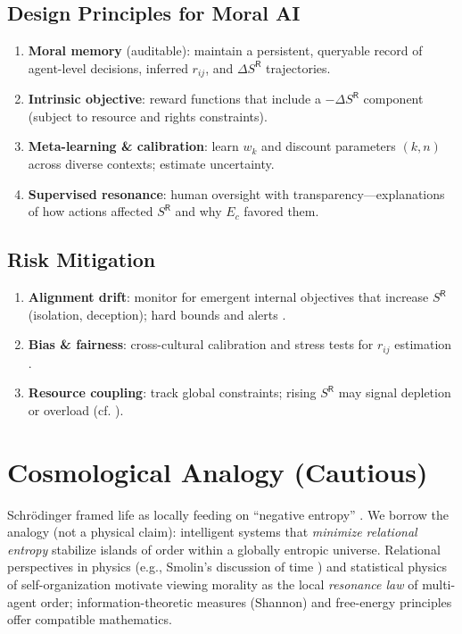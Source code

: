 \documentclass[11pt]{article}
\begin{document}
\subsection*{Design Principles for Moral AI}
\begin{enumerate}[leftmargin=*]
\item \textbf{Moral memory} (auditable): maintain a persistent, queryable record of agent-level decisions, inferred $r_{ij}$, and $\Delta S^{\mathsf{R}}$ trajectories.
\item \textbf{Intrinsic objective}: reward functions that include a $-\Delta S^{\mathsf{R}}$ component (subject to resource and rights constraints).
\item \textbf{Meta-learning \& calibration}: learn $w_k$ and discount parameters $(k,n)$ across diverse contexts; estimate uncertainty.
\item \textbf{Supervised resonance}: human oversight with transparency---explanations of how actions affected $S^{\mathsf{R}}$ and why $E_c$ favored them.
\end{enumerate}

\subsection*{Risk Mitigation}
\begin{enumerate}[leftmargin=*]
\item \textbf{Alignment drift}: monitor for emergent internal objectives that increase $S^{\mathsf{R}}$ (isolation, deception); hard bounds and alerts \cite{Amodei2016,IEEE2020}.
\item \textbf{Bias \& fairness}: cross-cultural calibration and stress tests for $r_{ij}$ estimation \cite{Floridi2020,Russell2019}.
\item \textbf{Resource coupling}: track global constraints; rising $S^{\mathsf{R}}$ may signal depletion or overload (cf. \cite{England2013}).
\end{enumerate}

\section{Cosmological Analogy (Cautious)}
Schr\"odinger framed life as locally feeding on ``negative entropy'' \cite{Schrodinger1944}. We borrow the analogy (not a physical claim): intelligent systems that \emph{minimize relational entropy} stabilize islands of order within a globally entropic universe. Relational perspectives in physics (e.g., Smolin's discussion of time \cite{Smolin2013}) and statistical physics of self-organization \cite{England2013} motivate viewing morality as the local \emph{resonance law} of multi-agent order; information-theoretic measures (Shannon) and free-energy principles \cite{Shannon1948,Friston2010} offer compatible mathematics.
\end{document}
